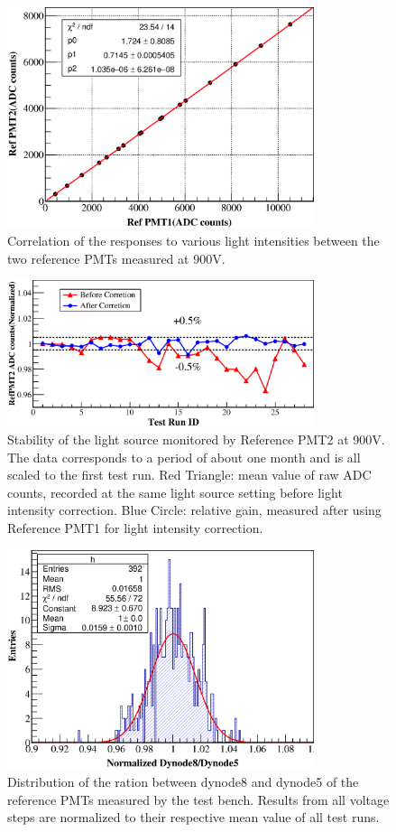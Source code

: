 \documentclass[review,number,sort&compress]{elsarticle}
\begin{document}
\begin{figure}[h!]
 \centering
 \includegraphics[width=90mm]{RelativeGainRef}
\caption{Correlation of the responses to various light intensities between the two reference PMTs measured at 900V.}
\label{fig:refgain_relation}
\end{figure} 

\begin{figure}[H]
 \centering
 \includegraphics[width=90mm]{led_stability}
\caption{Stability of the light source monitored by Reference PMT2 at 900V.
The data corresponds to a period of about one month and is all scaled to the first test run.
Red Triangle: mean value of raw ADC counts, recorded at the same light source setting before light intensity correction.
Blue Circle: relative gain, measured after using Reference PMT1 for light intensity correction.}
\label{fig:led_stability}
\end{figure} 

\begin{figure}[H]
 \centering
 \includegraphics[width=90mm]{RefDy58Dist}
\caption{Distribution of the ration between dynode8 and dynode5 of the reference PMTs measured by the test bench.
Results from all voltage steps are normalized to their respective mean value of all test runs.}
\label{fig:dy58_stabiltiy}
\end{figure} 
\end{document}
